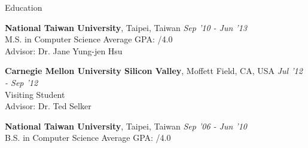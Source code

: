 \documentclass{resume} %
\begin{document}

\begin{rSection}{Education}

{\bf National Taiwan University}, Taipei, Taiwan \hfill {\em Sep '10 - Jun '13} \\ 
M.S. in Computer Science \hfill Average GPA: /4.0 \\
Advisor: Dr. Jane Yung-jen Hsu 

{\bf Carnegie Mellon University Silicon Valley}, Moffett Field, CA, USA \hfill {\em Jul '12 - Sep '12} \\ 
Visiting Student \\
Advisor: Dr. Ted Selker

{\bf National Taiwan University}, Taipei, Taiwan \hfill {\em Sep '06 - Jun '10} \\ 
B.S. in Computer Science \hfill Average GPA: /4.0 \\


\end{rSection}

\end{document}
